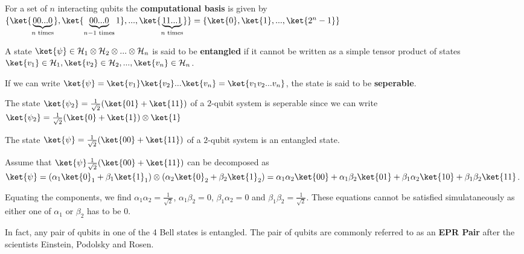 \begin{defn}

    For a set of $n$ interacting qubits the \textbf{computational basis} is given by $\{ \ket{\underbrace{00...0}_{n \text{ times}}}, \ket{\underbrace{00...0}_{n-1 \text{ times}}1}, ... ,\ket{\underbrace{11...1}_{n \text{ times}}} \} = \{ \ket{0}, \ket{1}, ... , \ket{2^n - 1} \}$
\end{defn}




\begin{defn}
    A state $\ket{\psi} \in \mathcal{H}_1 \otimes \mathcal{H}_2 \otimes ... \otimes \mathcal{H}_n$ is said to be \textbf{entangled} if it cannot be written as a simple tensor product of states $\ket{v_1} \in \mathcal{H}_1, \ket{v_2} \in \mathcal{H}_2, ..., \ket{v_n} \in \mathcal{H}_n$. 

    If we can write $\ket{\psi} = \ket{v_1}\ket{v_2}...\ket{v_n} = \ket{v_1 v_2...v_n}$, the state is said to be \textbf{seperable}.
\end{defn}

\begin{eg}
The state $\ket{\psi_2} = \frac{1}{\sqrt{2}} (\ket{01} + \ket{11})$ of a $2$-qubit system is seperable since we can write $\ket{\psi_2} = \frac{1}{\sqrt{2}} (\ket{0} + \ket{1}) \otimes \ket{1}$
\end{eg}


\begin{eg}
The state $\ket{\psi} = \frac{1}{\sqrt{2}} (\ket{00} + \ket{11})$ of a $2$-qubit system is an entangled state.

    Assume that  $\ket{\psi} \frac{1}{\sqrt{2}} (\ket{00} + \ket{11}) $ can be decomposed as $\ket{\psi} = (\alpha_1 \ket{0}_1 + \beta_1 \ket{1}_1) \otimes (\alpha_2 \ket{0}_2 + \beta_2 \ket{1}_2) = \alpha_1 \alpha_2 \ket{00} + \alpha_1 \beta_2 \ket{01} + \beta_1 \alpha_2 \ket{10} + \beta_1 \beta_2 \ket{11}$.

    Equating the components, we find $\alpha_1 \alpha_2 = \displaystyle\frac{1}{\sqrt{2}}$, $\alpha_1 \beta_2 = 0$, $\beta_1 \alpha_2 = 0$ and $\beta_1 \beta_2 = \displaystyle\frac{1}{\sqrt{2}}$. These equations cannot be satisfied simulataneously as either one of $\alpha_1$ or $\beta_2$ has to be $0$.
\end{eg}

In fact, any pair of qubits in one of the 4 Bell states is entangled. The pair of qubits are commonly referred to as an \textbf{EPR Pair} after the scientists Einstein, Podolsky and Rosen.


